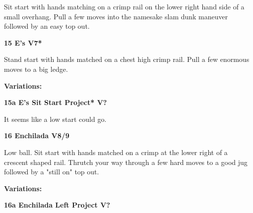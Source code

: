 \begin{multicols}{2}
			\begin{adjustwidth}{0.5cm}{}			
			Sit start with hands matching on a crimp rail on the lower right hand side of a small overhang. Pull a few moves into the namesake slam dunk maneuver followed by an easy top out.
			\end{adjustwidth}
			
			
			
			\needspace{1.5cm}
\label{rt:E's}
\colorbox{Goldenrod!50}{
\parbox{0.95\linewidth}{
\textbf{
15 E's V7*  
}}}

			\begin{adjustwidth}{0.5cm}{}			
			Stand start with hands matched on a chest high crimp rail. Pull a few enormous moves to a big ledge.
			\end{adjustwidth}
			
				\begin{adjustwidth}{0.5cm}{}				
				\needspace{3cm}
				\textbf{Variations:} \newline
					
					\needspace{1.5cm}
\label{vr:E's Sit Start Project}
\colorbox{black!20}{
\parbox{0.95\linewidth}{
\textbf{
15a E's Sit Start Project* V?  
}}}

					\begin{adjustwidth}{0.5cm}{}			
					It seems like a low start could go.
					\end{adjustwidth}
					
					
				\end{adjustwidth}
			


			\needspace{1.5cm}
\label{rt:Enchilada}
\colorbox{Goldenrod!50}{
\parbox{0.95\linewidth}{
\textbf{
16 Enchilada V8/9  
}}}

			\begin{adjustwidth}{0.5cm}{}			
			Low ball. Sit start with hands matched on a crimp at the lower right of a crescent shaped rail. Thrutch your way through a few hard moves to a good jug followed by a "still on" top out.
			\end{adjustwidth}
			
				\begin{adjustwidth}{0.5cm}{}				
				\needspace{3cm}
				\textbf{Variations:} \newline
					
					\needspace{1.5cm}
\label{vr:Enchilada Left Project}
\colorbox{black!20}{
\parbox{0.95\linewidth}{
\textbf{
16a Enchilada Left Project V?  
}}}


\end{adjustwidth}
\end{multicols}
